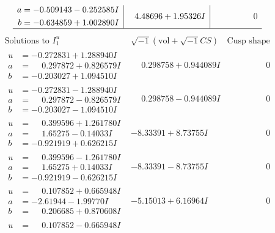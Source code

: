\documentclass[1p]{elsarticle_modified}
\theoremstyle{definition}
\newcommand{\I}{\sqrt{-1}}
\begin{document}
$$\begin{array}{c|c|c}
\begin{aligned}
a &= -0.509143 - 0.252585 I \\
b &= -0.634859 + 1.002890 I\end{aligned}
 & \phantom{-}4.48696 + 1.95326 I & \phantom{-0.000000 } 0\\
 \hline 
 \end{array}$$\newpage$$\begin{array}{c|c|c}  
\text{Solutions to }I^u_{1}& \I (\text{vol} + \sqrt{-1}CS) & \text{Cusp shape}\\
 \hline 
\begin{aligned}
u &= -0.272831 + 1.288940 I \\
a &= \phantom{-}0.297872 + 0.826579 I \\
b &= -0.203027 + 1.094510 I\end{aligned}
 & \phantom{-}0.298758 + 0.944089 I & \phantom{-0.000000 } 0 \\ \hline\begin{aligned}
u &= -0.272831 - 1.288940 I \\
a &= \phantom{-}0.297872 - 0.826579 I \\
b &= -0.203027 - 1.094510 I\end{aligned}
 & \phantom{-}0.298758 - 0.944089 I & \phantom{-0.000000 } 0 \\ \hline\begin{aligned}
u &= \phantom{-}0.399596 + 1.261780 I \\
a &= \phantom{-}1.65275 - 0.14033 I \\
b &= -0.921919 + 0.626215 I\end{aligned}
 & -8.33391 + 8.73755 I & \phantom{-0.000000 } 0 \\ \hline\begin{aligned}
u &= \phantom{-}0.399596 - 1.261780 I \\
a &= \phantom{-}1.65275 + 0.14033 I \\
b &= -0.921919 - 0.626215 I\end{aligned}
 & -8.33391 - 8.73755 I & \phantom{-0.000000 } 0 \\ \hline\begin{aligned}
u &= \phantom{-}0.107852 + 0.665948 I \\
a &= -2.61944 - 1.99770 I \\
b &= \phantom{-}0.206685 + 0.870608 I\end{aligned}
 & -5.15013 + 6.16964 I & \phantom{-0.000000 } 0 \\ \hline\begin{aligned}
u &= \phantom{-}0.107852 - 0.665948 I \\

\end{aligned}
\end{array}$$
\end{document}
